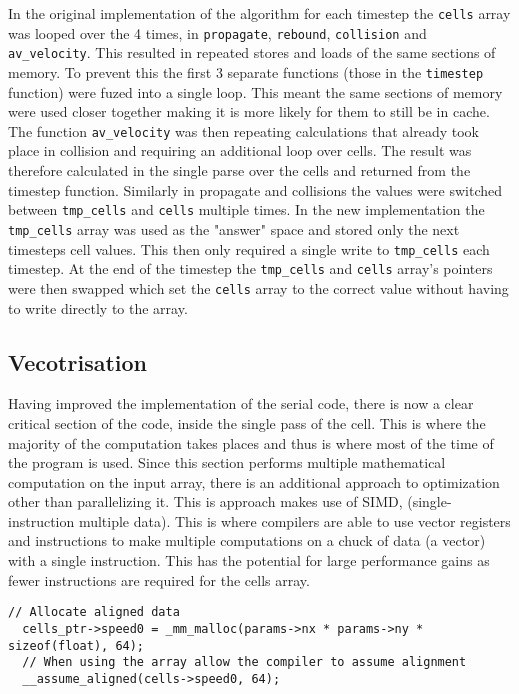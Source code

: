 \documentclass{article}
\begin{document}
\begin{multicols}{2}
In the original implementation of the algorithm for each timestep the
\verb|cells| array was looped over the 4 times, in \verb|propagate|,
\verb|rebound|, \verb|collision| and \verb|av_velocity|. This resulted in
repeated stores and loads of the same sections of memory. To prevent this the
first 3 separate functions (those in the \verb|timestep| function) were fuzed
into a single loop. This meant the same sections of memory were used closer
together making it is more likely for them to still be in cache. The function
\verb|av_velocity| was then repeating calculations that already took place in
collision and requiring an additional loop over cells. The result was therefore
calculated in the single parse over the cells and returned from the timestep
function. Similarly in propagate and collisions the values were switched
between \verb|tmp_cells| and \verb|cells| multiple times. In the new
implementation the \verb|tmp_cells| array was used as the "answer" space and
stored only the next timesteps cell values. This then only required a single
write to \verb|tmp_cells| each timestep. At the end of the timestep the
\verb|tmp_cells| and \verb|cells| array's pointers were then swapped which set
the \verb|cells| array to the correct value without having to write directly to
the array.

\subsection{Vecotrisation}

Having improved the implementation of the serial code, there is now a clear
critical section of the code, inside the single pass of the cell. This is where
the majority of the computation takes places and thus is where most of the time
of the program is used. Since this section performs multiple mathematical
computation on the input array, there is an additional approach to optimization
other than parallelizing it. This is approach makes use of SIMD,
(single-instruction multiple data). This is where compilers are able to use
vector registers and instructions to make multiple computations on a chuck of
data (a vector) with a single instruction. This has the potential for large
performance gains as fewer instructions are required for the cells array.

\begin{lstlisting}[style=CStyle, label={lst:cellsdataalign}, caption={Example of memory allignment for a cells array.},]
  // Allocate aligned data
  cells_ptr->speed0 = _mm_malloc(params->nx * params->ny * sizeof(float), 64);
  // When using the array allow the compiler to assume alignment
  __assume_aligned(cells->speed0, 64);
\end{lstlisting}


\end{multicols}
\end{document}
